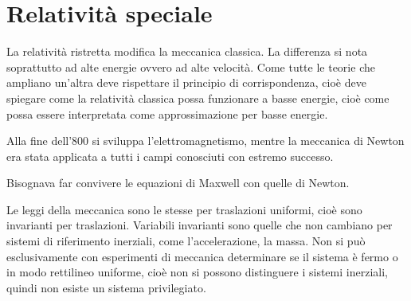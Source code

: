 \chapter{Relatività speciale}
La relatività ristretta modifica la meccanica classica. La differenza si nota soprattutto ad alte energie ovvero ad alte velocità. Come tutte le teorie che ampliano un'altra deve rispettare il principio di corrispondenza, cioè deve spiegare come la relatività classica possa funzionare a basse energie, cioè come possa essere interpretata come approssimazione per basse energie.

Alla fine dell'800 si sviluppa l'elettromagnetismo, mentre la meccanica di Newton era stata applicata a tutti i campi conosciuti con estremo successo.

Bisognava far convivere le equazioni di Maxwell con quelle di Newton.

Le leggi della meccanica sono le stesse per traslazioni uniformi, cioè sono invarianti per traslazioni. Variabili invarianti sono quelle che non cambiano per sistemi di riferimento inerziali, come l'accelerazione, la massa. Non si può esclusivamente con esperimenti di meccanica determinare se il sistema è fermo o in modo rettilineo uniforme, cioè non si possono distinguere i sistemi inerziali, quindi non esiste un sistema privilegiato.

